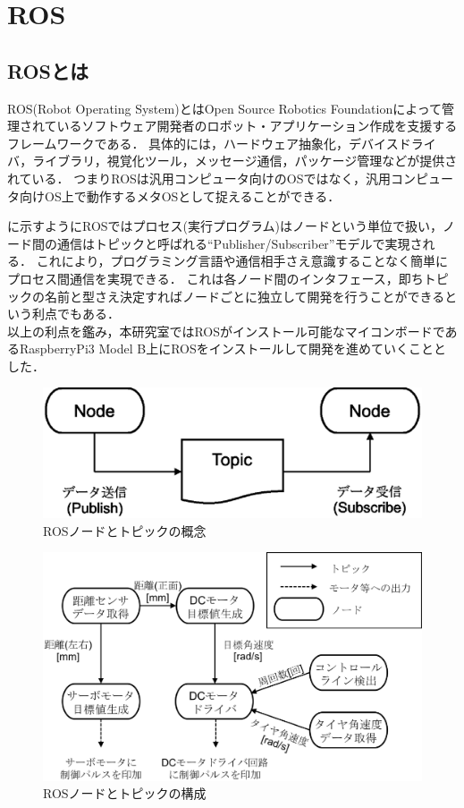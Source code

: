 \documentclass[10pt,a4j]{jarticle}
\begin{document}
\section{ROS}
\subsection{ROSとは\cite{kurazume}\cite{ogura}}
ROS(Robot Operating System)とはOpen Source Robotics Foundationによって管理されているソフトウェア開発者のロボット・アプリケーション作成を支援するフレームワークである．
具体的には，ハードウェア抽象化，デバイスドライバ，ライブラリ，視覚化ツール，メッセージ通信，パッケージ管理などが提供されている．
つまりROSは汎用コンピュータ向けのOSではなく，汎用コンピュータ向けOS上で動作するメタOSとして捉えることができる．

に示すようにROSではプロセス(実行プログラム)はノードという単位で扱い，ノード間の通信はトピックと呼ばれる``Publisher/Subscriber''モデルで実現される．
これにより，プログラミング言語や通信相手さえ意識することなく簡単にプロセス間通信を実現できる．
これは各ノード間のインタフェース，即ちトピックの名前と型さえ決定すればノードごとに独立して開発を行うことができるという利点でもある．\\

以上の利点を鑑み，本研究室ではROSがインストール可能なマイコンボードであるRaspberryPi3 Model B上にROSをインストールして開発を進めていくこととした．

\begin{figure}[htb]
  \centering
    \includegraphics[width=0.5\hsize]{picture/eps/ros_topic.eps}
    \caption{ROSノードとトピックの概念}
    \label{fig::ros_topic}
\end{figure}



\begin{figure}[htb]
  \centering
    \includegraphics[width=0.9\hsize]{picture/eps/ros_nodes.eps}
    \caption{ROSノードとトピックの構成}
    \label{fig::ros_nodes}
\end{figure}
\end{document}
